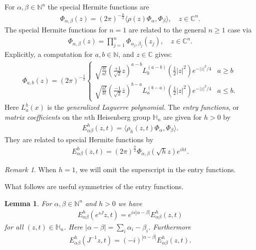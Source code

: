 \documentclass[11pt]{amsart}
\theoremstyle{plain}
\newtheorem{lemma}[theorem]{Lemma}
\theoremstyle{definition}
\theoremstyle{remark}
\newtheorem{remark}[theorem]{Remark}
\numberwithin{equation}{section}
\def\C{{\mathbb C}}%
\def\N{{\mathbb N}}%
\def \heis {\mathbb{H}}
\numberwithin{equation}{section}
\begin{document}
For $\alpha, \beta\in \N^n$ the special Hermite functions are
\begin{align}\label{specialHermite}
	\Phi_{\alpha, \beta}(z)=(2\pi)^{-\frac{n}{2}}\langle \rho(z)\Phi_\alpha, \Phi_\beta\rangle , \quad z\in \C^n.
\end{align}
The special Hermite functions for $n=1$ are related to the general $n\geq 1$ case via
\begin{align*}
	\Phi_{\alpha, \beta}(z)=\prod_{j=1}^n \Phi_{\alpha_j, \beta_j}(z_j), \quad z\in \mathbb{C}^n.
\end{align*}
Explicitly, a computation for  $a, b\in \N$,  and $z\in \C$ gives:
\begin{align*}
	\Phi_{a, b}(z)=(2\pi)^{-\frac{1}{2}}
	\begin{cases}
		\sqrt{\frac{b!}{a!}}\left(\frac{+1}{\sqrt{2}}z\right)^{a-b}L_b^{(a-b)}(\frac{1}{2}|z|^2)e^{-|z|^2/4} & a\geq b\\
		\sqrt{\frac{a!}{b!}}\left(\frac{-1}{\sqrt{2}}\overline{z}\right)^{b-a}L_a^{(b-a)}(\frac{1}{2}|z|^2)e^{-|z|^2/4} & a\leq b.
	\end{cases}
\end{align*}
Here $L_a^b(x)$ is the \textit{generalized Laguerre polynomial.} 
The  \textit{entry functions}, or \textit{matrix coefficients} on the $n$th Heisenberg group $\heis_n$ are given for $h>0$ by
\begin{align}\label{entryFunc}
	E_{\alpha\beta}^h(z, t)=\langle \rho_h(z, t)\Phi_\alpha, \Phi_\beta\rangle .
\end{align}
They are related to special Hermite functions by
\begin{align*}
	E^h_{\alpha\beta}(z, t)=(2\pi)^{\frac{n}{2}}\Phi_{\alpha, \beta}(\sqrt{h}z)e^{iht}.
\end{align*}
\begin{remark}
	When $h=1$, we will omit the superscript in the entry functions.
\end{remark} What follows are useful symmetries of the entry functions. 
\begin{lemma}\label{cylinSym} For $\alpha, \beta\in \N^n$ and $h>0$ we have
	\begin{align*}
		E_{\alpha\beta}^h(e^{sJ}z, t)=e^{is|\alpha-\beta|}E_{\alpha\beta}^h(z, t)
	\end{align*}
	for all $(z, t)\in \heis_n$. Here  $|\alpha-\beta|=\sum_{i}\alpha_i-\beta_i$.
	Furthermore
	\begin{align*}
		E_{\alpha\beta}^h(J^{-1}z, t)=(-i)^{|\alpha-\beta|}E_{\alpha\beta}^h(z, t).
	\end{align*}
\end{lemma}
\end{document}
